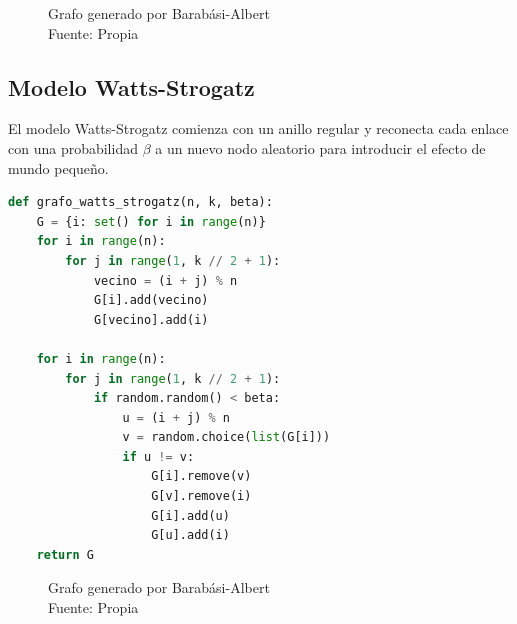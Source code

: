 \documentclass[12pt]{book}
\begin{document}
\begin{figure}[h]
\caption{Grafo generado por Barabási-Albert\\Fuente: Propia}
\end{figure}


\subsection{Modelo Watts-Strogatz}

El modelo Watts-Strogatz comienza con un anillo regular y reconecta cada enlace con una probabilidad \( \beta \) a un nuevo nodo aleatorio para introducir el efecto de mundo pequeño.

\begin{lstlisting}[language=Python]
def grafo_watts_strogatz(n, k, beta):
    G = {i: set() for i in range(n)}
    for i in range(n):
        for j in range(1, k // 2 + 1):
            vecino = (i + j) % n
            G[i].add(vecino)
            G[vecino].add(i)

    for i in range(n):
        for j in range(1, k // 2 + 1):
            if random.random() < beta:
                u = (i + j) % n
                v = random.choice(list(G[i]))
                if u != v:
                    G[i].remove(v)
                    G[v].remove(i)
                    G[i].add(u)
                    G[u].add(i)
    return G
\end{lstlisting}
\begin{figure}[h]
\caption{Grafo generado por Barabási-Albert\\Fuente: Propia}
\end{figure}
\newpage
\end{document}
